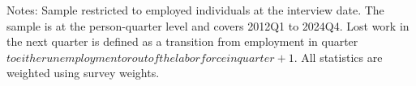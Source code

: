 \begin{table}[H]
{
\begin{tablenotes}
\item \scriptsize{Notes: Sample restricted to employed individuals at the interview date. The sample is at the person-quarter level and covers 2012Q1 to 2024Q4. Lost work in the next quarter is defined as a transition from employment in quarter $ to either unemployment or out of the labor force in quarter +1$. All statistics are weighted using survey weights.}
\end{tablenotes}
}
\end{table}
